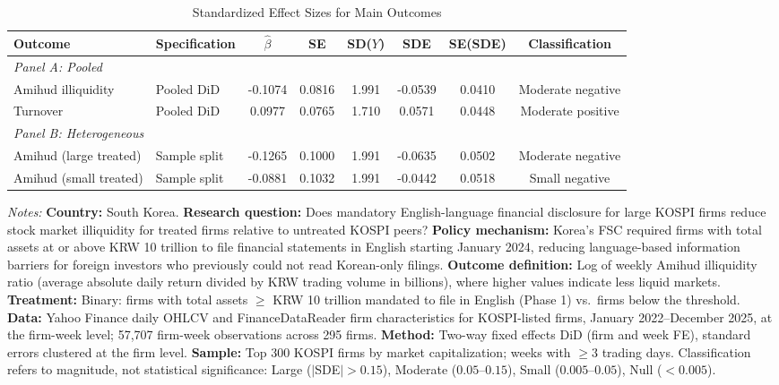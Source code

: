 \begin{table}[H]
\centering
\caption{Standardized Effect Sizes for Main Outcomes}
\label{tab:sde}
\begin{threeparttable}
\begin{adjustbox}{max width=\textwidth}
\begin{tabular}{llcccccc}
\toprule
Outcome & Specification & $\hat{\beta}$ & SE & SD($Y$) & SDE & SE(SDE) & Classification \\
\midrule
\multicolumn{8}{l}{\textit{Panel A: Pooled}} \\
Amihud illiquidity & Pooled DiD & -0.1074 & 0.0816 & 1.991 & -0.0539 & 0.0410 & Moderate negative \\
Turnover & Pooled DiD & 0.0977 & 0.0765 & 1.710 & 0.0571 & 0.0448 & Moderate positive \\
\midrule
\multicolumn{8}{l}{\textit{Panel B: Heterogeneous}} \\
Amihud (large treated) & Sample split & -0.1265 & 0.1000 & 1.991 & -0.0635 & 0.0502 & Moderate negative \\
Amihud (small treated) & Sample split & -0.0881 & 0.1032 & 1.991 & -0.0442 & 0.0518 & Small negative \\
\bottomrule
\end{tabular}
\end{adjustbox}
\end{threeparttable}
\par\vspace{0.3em}
{\footnotesize \textit{Notes:} \textbf{Country:} South Korea. \textbf{Research question:} Does mandatory English-language financial disclosure for large KOSPI firms reduce stock market illiquidity for treated firms relative to untreated KOSPI peers? \textbf{Policy mechanism:} Korea's FSC required firms with total assets at or above KRW 10 trillion to file financial statements in English starting January 2024, reducing language-based information barriers for foreign investors who previously could not read Korean-only filings. \textbf{Outcome definition:} Log of weekly Amihud illiquidity ratio (average absolute daily return divided by KRW trading volume in billions), where higher values indicate less liquid markets. \textbf{Treatment:} Binary: firms with total assets $\geq$ KRW 10 trillion mandated to file in English (Phase 1) vs.\ firms below the threshold. \textbf{Data:} Yahoo Finance daily OHLCV and FinanceDataReader firm characteristics for KOSPI-listed firms, January 2022--December 2025, at the firm-week level; 57,707 firm-week observations across 295 firms. \textbf{Method:} Two-way fixed effects DiD (firm and week FE), standard errors clustered at the firm level. \textbf{Sample:} Top 300 KOSPI firms by market capitalization; weeks with $\geq$3 trading days. Classification refers to magnitude, not statistical significance: Large ($|$SDE$| > 0.15$), Moderate ($0.05$--$0.15$), Small ($0.005$--$0.05$), Null ($< 0.005$).}
\end{table}
